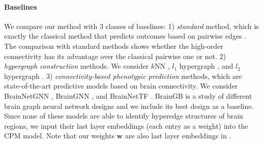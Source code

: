 \begin{table}[t]
\caption{Ablation studies on the masking mechanism. Results are averaged over 10 runs.}
\label{tab:ablation_mask}
\end{table}

\paragraph{Baselines}
We compare our method with $3$ classes of baselines: 1) \textit{standard} method, which is exactly the classical method that predicts outcomes based on pairwise edges \citep{shen2017using, DADI2019115, bhaa407}. The comparison with standard methods shows whether the high-order connectivity has its advantage over the classical pairwise one or not. 
2) \textit{hypergraph construction} methods. We consider $k$NN \citep{huang2009video}, $l_1$ hypergraph \citep{wang2015visual}, and $l_2$ hypergraph \citep{jin2019robust}.
3) \textit{connectivity-based  phenotypic prediction} methods, which are state-of-the-art predictive models based on brain connectivity. We consider BrainNetGNN \citep{mahmood2021deep}, BrainGNN \citep{li2021braingnn}, and BrainNetTF \citep{kan2022brain}. BrainGB \citep{cui2022braingb} is a study of different brain graph neural network designs and we include its best design as a baseline. Since none of these models are able to identify hyperedge structures of brain regions, we input their last layer embeddings (each entry as a weight) into the CPM model. Note that our weights $\boldsymbol{w}$ are also last layer embeddings in \hybrid{}.

